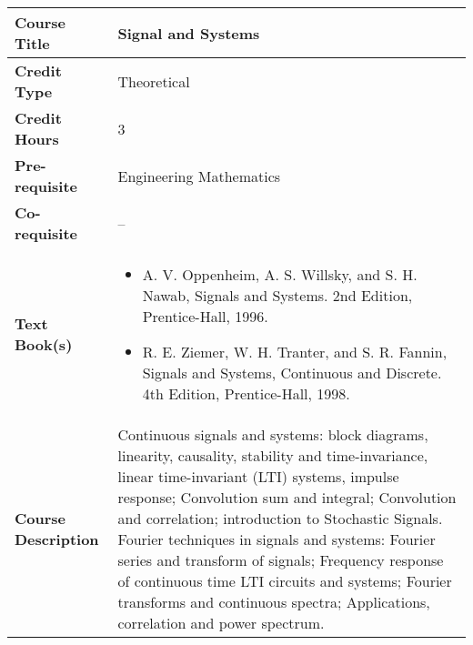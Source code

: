 \documentclass[11pt]{article}
\begin{document}
\begin{table}[h!]
\begin{tabular}{|l|l|}
\hline
\textbf{Course Title}       &  Signal and Systems  \\ \hline
\textbf{Credit Type}        &  Theoretical \\ \hline
\textbf{Credit Hours}       & 3 \\ \hline
\textbf{Pre-requisite}       &   Engineering Mathematics \\ \hline
\textbf{Co-requisite}       &  -- \\ \hline
\textbf{Text Book(s)}       & \begin{minipage}{.70\textwidth}
\begin{itemize} \itemsep-0.4em
	\vspace{3mm}
	\item A. V. Oppenheim, A. S. Willsky, and S. H. Nawab, Signals and Systems. 2nd Edition, Prentice-Hall, 1996.
	\item R. E. Ziemer, W. H. Tranter, and S. R. Fannin, Signals and Systems, Continuous and Discrete. 4th Edition, Prentice-Hall, 1998.
	\vspace{3mm}
\end{itemize}
\end{minipage}\\ \hline
\textbf{Course Description} & \begin{minipage}{.70\textwidth}
\vspace{3mm}
Continuous signals and systems: block diagrams, linearity, causality, stability and time-invariance, linear time-invariant (LTI) systems, impulse response; Convolution sum and integral; Convolution and correlation; introduction to Stochastic Signals. Fourier techniques in signals and systems: Fourier series and transform of signals; Frequency response of continuous time LTI circuits and systems; Fourier transforms and continuous spectra; Applications, correlation and power spectrum. 
\vspace{3mm}
\end{minipage} \\ \hline
\end{tabular}
\end{table}
\end{document}
